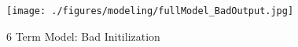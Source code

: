 \begin{figure}
\texttt{[image: ./figures/modeling/fullModel\_BadOutput.jpg]}
\centering
\caption{6 Term Model: Bad Initilization}
\label{fig:fullModel_BadOutput}
\end{figure}
